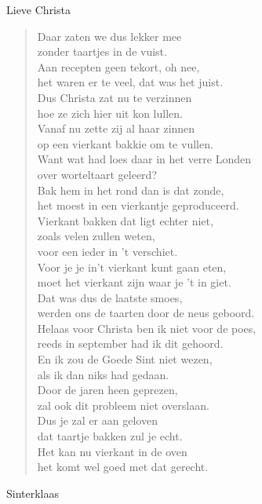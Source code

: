 \documentclass[12pt]{brief}
\begin{document}
\begin{letter}{Lieve Christa}
\begin{verse}
Daar zaten we dus lekker mee\\
zonder taartjes in de vuist.\\
Aan recepten geen tekort, oh nee,\\
het waren er te veel, dat was het juist.\\[1.5em]

Dus Christa zat nu te verzinnen\\
hoe ze zich hier uit kon lullen.\\
Vanaf nu zette zij al haar zinnen\\
op een vierkant bakkie om te vullen.\\[1.5em]

Want wat had loes daar in het verre Londen\\
over worteltaart geleerd?\\
Bak hem in het rond dan is dat zonde,\\
het moest in een vierkantje geproduceerd.\\[1.5em]

Vierkant bakken dat ligt echter niet,\\
zoals velen zullen weten,\\
voor een ieder in 't verschiet.\\
Voor je je in't vierkant kunt gaan eten,\\
moet het vierkant zijn waar je 't in giet.\\[1.5em]

Dat was dus de laatste smoes,\\
werden ons de taarten door de neus geboord.\\
Helaas voor Christa ben ik niet voor de poes,\\
reeds in september had ik dit gehoord.\\[1.5em]

En ik zou de Goede Sint niet wezen,\\
als ik dan niks had gedaan.\\
Door de jaren heen geprezen,\\
zal ook dit probleem niet overslaan.\\[1.5em]

Dus je zal er aan geloven\\
dat taartje bakken zul je echt.\\
Het kan nu vierkant in de oven\\
het komt wel goed met dat gerecht.\\[2em]

\end{verse}


Sinterklaas


\closing{}

\end{letter}
\end{document}
